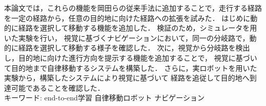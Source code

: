 本論文では，これらの機能を岡田らの従来手法に追加することで，走行する経路を一定の経路から，任意の目的地に向けた経路への拡張を試みた．
はじめに動的に経路を選択して移動する機能を追加した．
検証のため，シミュレータを用いた実験を行い，
視覚に基づくナビゲーションにおいて，同一の分岐路で，動的に経路を選択して移動する様子を確認した．
次に，視覚から分岐路を検出し，目的地に向けた進行方向を提示する機能を追加することで，
視覚に基づいて目的地まで自律移動するシステムを構築した．
さらに，実ロボットを用いた実験から，構築したシステムにより視覚に基づいて
経路を追従して目的地へ到達可能であることを確認した．\\
\vspace{1zh}
キーワード: end-to-end学習 自律移動ロボット ナビゲーション
\newpage
